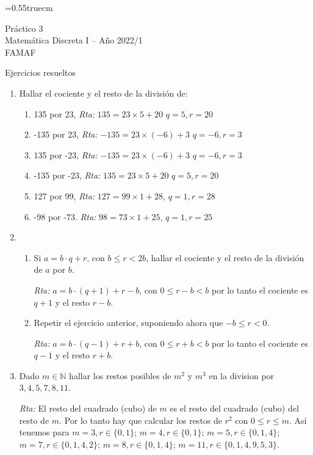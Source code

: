 \documentclass[a4paper,12pt,twoside,spanish,reqno]{amsbook}
\numberwithin{equation}{section}
\newcommand{\rta}{\noindent\textit{Rta: }}
\begin{document}
    \baselineskip=0.55truecm %
    
    
{\bf \begin{center} Práctico 3 \\ Matemática Discreta I -- Año 2022/1 \\ FAMAF \end{center}}

{\bf \begin{center} Ejercicios resueltos \end{center}}


\begin{enumerate}

\item Hallar el cociente y el resto de la divisi\'on de:
\begin{enumerate}
\item 
135 por 23, \rta $135= 23\times 5 +20$ $q=5, r=20$
\item
-135 por 23, \rta $-135= 23\times (-6) +3$ $q=-6, r=3$
\item
135 por -23, \rta $ -135= 23\times (-6) +3$ $q=-6, r=3$
\item
-135 por -23, \rta $135= 23\times 5 +20$ $q=5, r=20$
\item
127 por 99, \rta $127=99\times1+28$, $q=1, r=28$
\item
-98 por -73. \rta $ 98=73\times 1+25$, $q=1, r=25$
\end{enumerate}


\item 
\begin{enumerate}
    \item Si $a=b\cdot q+r$, con $b \le r <2 b$, hallar el cociente y el resto de la divisi\'on de $a$ por $b$.
    
    \rta $a = b \cdot (q+1) + r-b$, con $0 \le r-b < b$ por lo tanto el cociente es $q+1$ y el resto  $r-b$.
    
    
    \item Repetir el ejercicio anterior, suponiendo ahora que $-b \le r < 0$.  
    
    \rta  $a = b \cdot (q-1) + r+b$, con $0 \le r+b < b$ por lo tanto el cociente es $q-1$ y el resto  $r+b$.
\end{enumerate}



\item Dado $m\in \mathbb N$ hallar los restos posibles de $m^2$ y $m^3$ en la division por $3,4,5,7,8, 11$.


\rta El resto del cuadrado (cubo)  de $m$ es el resto del cuadrado (cubo)  del resto de $m$.
Por lo tanto hay que calcular los restos de $r^2$ con $0\le r\le m$.
Así tenemos para $m=3, r\in\{0, 1\}$; $m=4, r\in\{0,1\}$; $m=5, r\in\{0,1,4\}$; $m=7,r\in\{0,1,4,2\}$;
$m=8, r\in\{0,1,4\}$; $m=11, r\in\{0,1,4,9,5,3\}$.




\end{enumerate}
\end{document}
